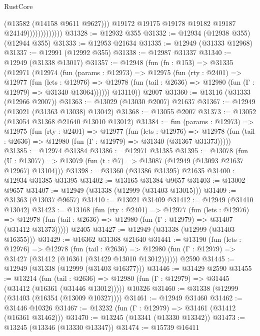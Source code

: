 \begin{lexlean}{RustCore}
\begin{coremodule}
                                (@13582 (@14158 @9611 @9627)))
                              @19172
                              @19175
                              @19178
                              @19182
                              @19187
                              @24149)))))))))))))
@31328 := @12932 @355
@31332 := @12934 (@12938 @355) (@12944 @355)
@31333 := @12953 @21634
@31335 := @12949 (@31333 @12968)
@31337 := @12991 (@12992 @355)
@31338 := @12987 @31337
@31340 := @12949 (@31338 @13017)
@31357 := @12948
    (fun (fn : @153) =>
    @31335
      (@12971
        (@12974
          (fun (params : @12973) =>
          @12975
            (fun (rty : @2401) =>
            @12977
              (fun (lets : @12976) =>
              @12978 (fun (tail : @2636) => @12980 (fun (Γ : @12979) => @31340 @13064))))))
        @13110))
    @2007
@31360 := @13116 (@31333 (@12966 @2007))
@31363 := @13029 (@13030 @2007) @21637
@31367 := @12949 (@13021 (@31363 @13038) @13042)
@31368 := @13055 @2007
@31373 := @13052 (@13054 @31368 @21640 @13010 @13012)
@31384 := fun (params : @12973) =>
  @12975
    (fun (rty : @2401) =>
    @12977
      (fun (lets : @12976) =>
      @12978 (fun (tail : @2636) => @12980 (fun (Γ : @12979) => @31340 (@31367 @31373)))))
@31385 := @12974 @31384
@31386 := @12971 @31385
@31395 := @13078
    (fun (U : @13077) => @13079 (fun (t : @7) => @13087 (@12949 (@13093 @21637 @12967) @13104)))
@31398 := @31360 (@31386 @31395) @21635
@31400 := @12934 @31385 @31395
@31402 := @13165 @31384 @9657
@31403 := @13002 @9657
@31407 := @12949 (@31338 (@12999 (@31403 @13015)))
@31409 := @31363 (@13037 @9657)
@31410 := @13021 @31409
@31412 := @12949 (@31410 @13042)
@31423 := @13168
    (fun (rty : @2401) =>
    @12977
      (fun (lets : @12976) =>
      @12978 (fun (tail : @2636) => @12980 (fun (Γ : @12979) => @31407 (@31412 @31373)))))
    @2405
@31427 := @12949 (@31338 (@12999 (@31403 @16355)))
@31429 := @16362 @31368 @21640
@31441 := @13190
    (fun (lets : @12976) =>
    @12978
      (fun (tail : @2636) =>
      @12980 (fun (Γ : @12979) => @31427 (@31412 (@16361 (@31429 @13010 @13012))))))
    @2590
@31445 := @12949 (@31338 (@12999 (@31403 @16377)))
@31446 := @31429 @2590
@31455 := @13214
    (fun (tail : @2636) => @12980 (fun (Γ : @12979) => @31445 (@31412 (@16361 (@31446 @13012)))))
    @10326
@31460 := @31338 (@12999 (@31403 (@16354 (@13009 @10327))))
@31461 := @12949 @31460
@31462 := @31446 @10326
@31467 := @13232 (fun (Γ : @12979) => @31461 (@31412 (@16361 @31462)))
@31470 := @13245 (@13341 (@13330 @13342))
@31473 := @13245 (@13346 (@13330 @13347))
@31474 := @15739 @16411

\end{coremodule}
\end{lexlean}
